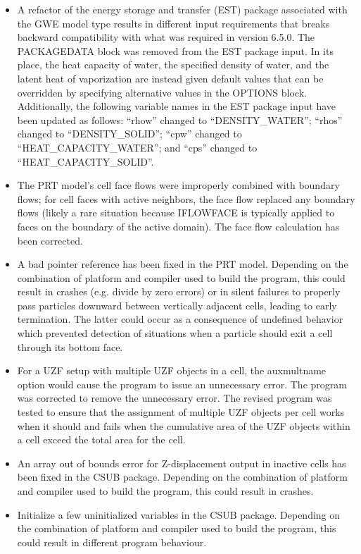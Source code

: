 \begin{itemize}
		\item A refactor of the energy storage and transfer (EST) package associated with the GWE model type results in different input requirements that breaks backward compatibility with what was required in version 6.5.0.  The PACKAGEDATA block was removed from the EST package input.  In its place, the heat capacity of water, the specified density of water, and the latent heat of vaporization are instead given default values that can be overridden by specifying alternative values in the OPTIONS block.  Additionally, the following variable names in the EST package input have been updated as follows: ``rhow'' changed to ``DENSITY\_WATER''; ``rhos'' changed to ``DENSITY\_SOLID''; ``cpw'' changed to ``HEAT\_CAPACITY\_WATER''; and ``cps'' changed to ``HEAT\_CAPACITY\_SOLID''.
		\item The PRT model's cell face flows were improperly combined with boundary flows; for cell faces with active neighbors, the face flow replaced any boundary flows (likely a rare situation because IFLOWFACE is typically applied to faces on the boundary of the active domain). The face flow calculation has been corrected.
		\item A bad pointer reference has been fixed in the PRT model. Depending on the combination of platform and compiler used to build the program, this could result in crashes (e.g. divide by zero errors) or in silent failures to properly pass particles downward between vertically adjacent cells, leading to early termination. The latter could occur as a consequence of undefined behavior which prevented detection of situations when a particle should exit a cell through its bottom face.
		\item For a UZF setup with multiple UZF objects in a cell, the auxmultname option would cause the program to issue an unnecessary error.  The program was corrected to remove the unnecessary error.  The revised program was tested to ensure that the assignment of multiple UZF objects per cell works when it should and fails when the cumulative area of the UZF objects within a cell exceed the total area for the cell.
		\item An array out of bounds error for Z-displacement output in inactive cells has been fixed in the CSUB package. Depending on the combination of platform and compiler used to build the program, this could result in crashes.
		\item Initialize a few uninitialized variables in the CSUB package. Depending on the combination of platform and compiler used to build the program, this could result in different program behaviour.

\end{itemize}
